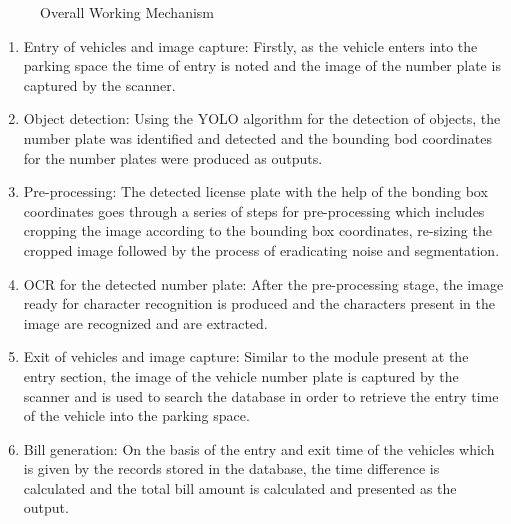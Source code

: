 \begin{figure}[h]
\centering
    \caption{Overall Working Mechanism}
    \label{fig:my_label}
\end{figure}
\begin{enumerate}
	\item Entry of vehicles and image capture: Firstly, as the vehicle enters into the parking space the time of entry is noted and the image of the number plate is captured by the scanner.
	\item Object detection: Using the YOLO algorithm for the detection of objects, the number plate was identified and detected and the bounding bod coordinates for the number plates were produced as outputs.
	\item Pre-processing: The detected license plate with the help of the bonding box coordinates goes through a series of steps for pre-processing which includes cropping the image according to the bounding box coordinates, re-sizing the cropped image followed by the process of eradicating noise and segmentation.
	\item OCR for the detected number plate: After the pre-processing stage, the image ready for character recognition is produced and the characters present in the image are recognized and are extracted. 
	\item Exit of vehicles and image capture: Similar to the module present at the entry section, the image of the vehicle number plate is captured by the scanner and is used to search the database in order to retrieve the entry time of the vehicle into the parking space.
	\item Bill generation: On the basis of the entry and exit time of the vehicles which is given by the records stored in the database, the time difference is calculated and the total bill amount is calculated and presented as the output.
\end{enumerate}
